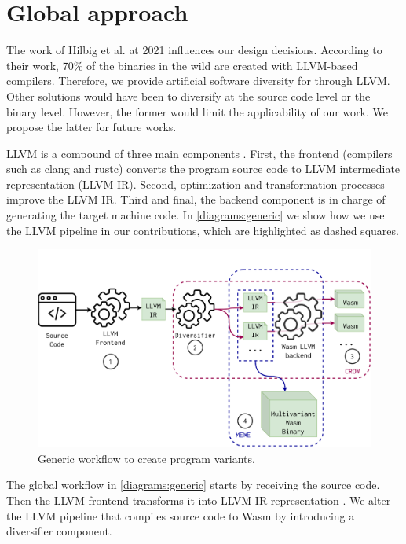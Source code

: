 \section{Global approach}
\label{tech:generic}


The work of Hilbig et al. \cite{Hilbig2021AnES} at 2021 influences our design decisions. According to their work, 70\% of the \wasm binaries in the wild are created with LLVM-based compilers. Therefore, we provide artificial software diversity for \wasm through LLVM. 
Other solutions would have been to diversify at the source code level or the \wasm binary level. However, the former would limit the applicability of our work. We propose the latter for future works.

LLVM is a compound of three main components \cite{llvmofficialweb}. First, the frontend (compilers such as clang and rustc) converts the program source code to LLVM intermediate representation (LLVM IR). Second, optimization and transformation processes improve the LLVM IR. Third and final, the backend component is in charge of generating the target machine code. In \autoref{diagrams:generic} we show how we use the LLVM pipeline in our contributions, which are highlighted as dashed squares.

\begin{figure}[h]
    \includegraphics[width=\linewidth]{diagrams/architecture.pdf}
    \caption{Generic workflow to create \wasm program variants.}
    \label{diagrams:generic}
\end{figure}



The global workflow in \autoref{diagrams:generic} starts by receiving the source code. Then the LLVM frontend transforms it into LLVM IR representation . 
We alter the LLVM pipeline that compiles source code to Wasm by introducing a diversifier component.  

